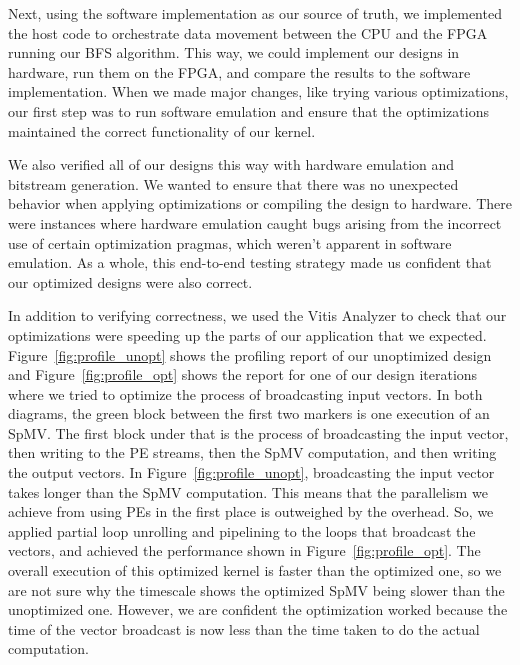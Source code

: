 \documentclass[10pt]{article}
\begin{document}
\noindent Next, using the software implementation as our source of truth, we implemented the host code to orchestrate
data movement between the CPU and the FPGA running our BFS algorithm. This way, we could implement our designs
in hardware, run them on the FPGA, and compare the results to the software implementation. When we made
major changes, like trying various optimizations, our first step was to run software emulation and ensure
that the optimizations maintained the correct functionality of our kernel. \newline 

\noindent We also verified all of our designs this way with hardware emulation and bitstream generation. We wanted
to ensure that there was no unexpected behavior when applying optimizations or compiling the design
to hardware. There were instances where hardware emulation caught bugs arising from the incorrect use
of certain optimization pragmas, which weren't apparent in software emulation. As a whole, this end-to-end
testing strategy made us confident that our optimized designs were also correct. \newline

\noindent In addition to verifying correctness, we used the Vitis Analyzer to
check that our optimizations were speeding up the parts of our application that
we expected. Figure~\ref{fig:profile_unopt} shows the profiling report of our
unoptimized design and Figure~\ref{fig:profile_opt} shows the report for one of
our design iterations where we tried to optimize the process of broadcasting
input vectors. In both diagrams, the green block between the first two markers
is one execution of an SpMV. The first block under that is the process of
broadcasting the input vector, then writing to the PE streams, then the SpMV
computation, and then writing the output vectors. In
Figure~\ref{fig:profile_unopt}, broadcasting the input vector takes longer than the SpMV computation.
This means that the parallelism we achieve from using PEs in the first place is outweighed by the overhead.
So, we applied partial loop unrolling and pipelining to the loops that broadcast the vectors, and achieved the
performance shown in Figure~\ref{fig:profile_opt}. The overall execution of this optimized kernel is faster than
the optimized one, so we are not sure why the timescale shows the optimized SpMV being slower than the unoptimized one.
However, we are confident the optimization worked because the time of the vector broadcast is now less than the time
taken to do the actual computation. \newline
\end{document}
